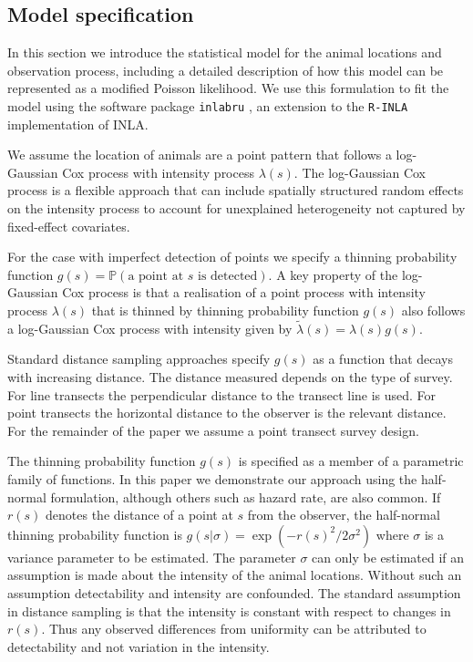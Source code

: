 \documentclass[preprint,12pt]{elsarticle}
\newcommand{\tl}{\tilde{\lambda}}   %
\begin{document}
\subsection{Model specification}

In this section we introduce the statistical model for the animal locations and observation process, including a detailed description of how this model can be represented as a modified Poisson likelihood.  We use this formulation to fit the model using the software package \texttt{inlabru} \citep{bachl_inlabru_2019}, an extension to the \texttt{R-INLA} implementation of INLA.

We assume the location of animals are a point pattern that follows a log-Gaussian Cox process with intensity process $\lambda(s)$.  The log-Gaussian Cox process is a flexible approach that can include spatially structured random effects on the intensity process to account for unexplained heterogeneity not captured by fixed-effect covariates.

\sloppy For the case with imperfect detection of points we specify a thinning probability function $g(s) = \mathbb{P}(\text{a point at $s$ is detected})$. A key property of the log-Gaussian Cox process is that a realisation of a point process with intensity process $\lambda(s)$ that is thinned by thinning probability function $g(s)$ also follows a log-Gaussian Cox process with intensity given by $\tl(s) = \lambda(s)g(s)$.

Standard distance sampling approaches specify $g(s)$ as a function that decays with increasing distance.  The distance measured depends on the type of survey.  For line transects the perpendicular distance to the transect line is used.  For point transects the horizontal distance to the observer is the relevant distance.  For the remainder of the paper we assume a point transect survey design.  

The thinning probability function $g(s)$ is specified as a member of a parametric family of functions.  In this paper we demonstrate our approach using the half-normal formulation, although others such as hazard rate, are also common.  If $r(s)$ denotes the distance of a point at $s$ from the observer, the half-normal thinning probability function is $g(s | \sigma) = \exp(-r(s)^2 / 2\sigma^2)$ where $\sigma$ is a variance parameter to be estimated.  The parameter $\sigma$ can only be estimated if an assumption is made about the intensity of the animal locations.  Without such an assumption detectability and intensity are confounded.  The standard assumption in distance sampling is that the intensity is constant with respect to changes in $r(s)$.  Thus any observed differences from uniformity can be attributed to detectability and not variation in the intensity.
\end{document}

